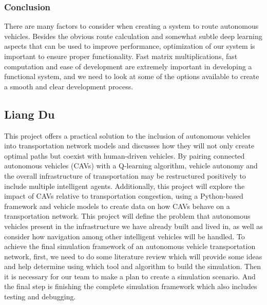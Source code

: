 \documentclass[onecolumn, draftclsnofoot,10pt, compsoc]{IEEEtran}
\begin{document}
\subsubsection{Conclusion}
There are many factors to consider when creating a system to route autonomous vehicles.
Besides the obvious route calculation and somewhat subtle deep learning aspects that can be used to improve performance, optimization of our system is important to ensure proper functionality.
Fast matrix multiplications, fast computation and ease of development are extremely important in developing a functional system, and we need to look at some of the options available to create a smooth and clear development process.
\subsection{Liang Du}
This project offers a practical solution to the inclusion of autonomous vehicles into transportation network models and discusses how they will not only create optimal paths but coexist with human-driven vehicles.
By pairing connected autonomous vehicles (CAVs) with a Q-learning algorithm, vehicle autonomy and the overall infrastructure of transportation may be restructured positively to include multiple intelligent agents.
Additionally, this project will explore the impact of CAVs relative to transportation congestion, using a Python-based framework and vehicle models to create data on how CAVs behave on a transportation network.
This project will define the problem that autonomous vehicles present in the infrastructure we have already built and lived in, as well as consider how navigation among other intelligent vehicles will be handled.
To achieve the final simulation framework of an autonomous vehicle transportation network, first, we need to do some literature review which will provide some ideas and help determine using which tool and algorithm to build the simulation.
Then it is necessary for our team to make a plan to create a simulation scenario.
And the final step is finishing the complete simulation framework which also includes testing and debugging.
\end{document}
